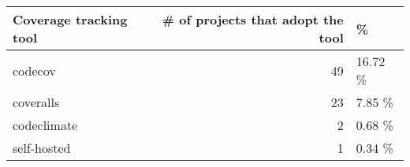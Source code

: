\begin{table}
\centering
\begin{tabular}[t]{l|r|l}
\hline
Coverage tracking tool & \# of projects that adopt the tool & \%\\
\hline
codecov & 49 & 16.72 \%\\
\hline
coveralls & 23 & 7.85 \%\\
\hline
codeclimate & 2 & 0.68 \%\\
\hline
self-hosted & 1 & 0.34 \%\\
\hline
\end{tabular}
\end{table}
